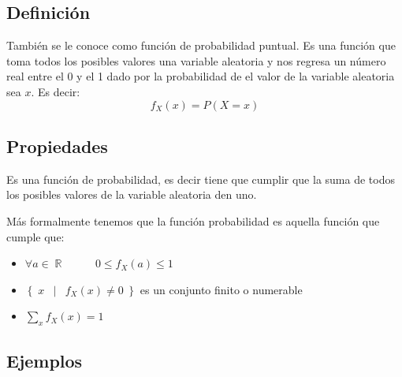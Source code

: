 \documentclass[12pt, fleqn]{report}                             %
\DeclareMathOperator \Space {\quad}                             %
\DeclareMathOperator \MegaSpace {\quad \quad}                   %
\DeclareMathOperator \MiniSpace {\;}                            %
\newcommand \Such {\MiniSpace | \MiniSpace}                     %
\theoremstyle{break}                                            %
\DeclareMathOperator \Reals        {\mathbb{R}}                 %
\newcommand{\Set}[1]{\left\{ \; #1 \; \right\}}                 %
\begin{document}
            \subsection{Definición}

                También se le conoce como función de probabilidad puntual.
                Es una función que toma todos los posibles valores una variable aleatoria y nos regresa un número
                real entre el 0 y el 1 dado por la probabilidad de el valor de la variable aleatoria sea $x$.
                Es decir:
                \begin{equation*}
                    f_X (x) = P(X = x)
                \end{equation*}


            \subsection{Propiedades}

                Es una función de probabilidad, es decir tiene que cumplir que la suma de todos los posibles
                valores de la variable aleatoria den uno.

                Más formalmente tenemos que la función probabilidad es aquella función que cumple que:
                \begin{itemize}
                    \item $\forall a \in \Reals \MegaSpace 0 \leq f_X(a) \leq 1$
                    \item $\Set{x \Such f_X(x) \neq 0}$ es un conjunto finito o numerable
                    \item $\displaystyle \sum_x f_X(x) = 1$
                \end{itemize}

            \clearpage
            \subsection{Ejemplos}
\end{document}
